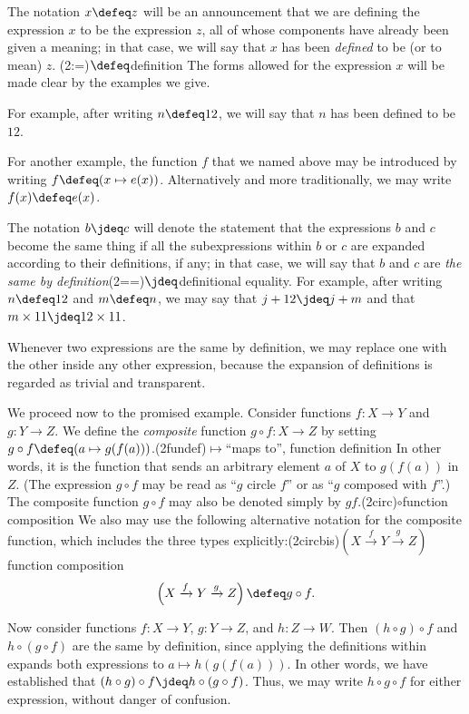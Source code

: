 The notation $x \defeq z$ will be an announcement that we are defining
the expression $x$ to be the expression $z$, all of whose components have already been given a meaning;
in that case, we will say that $x$ has been \emph{defined} to be (or to mean) $z$.%
\glossary(2:=){$\protect\defeq$}{definition}
The forms allowed for the expression $x$ will be made clear by the examples we give.

For example, after writing $n \defeq 12$, we will say that $n$ has been defined to be $12$.

For another example, the function $f$ that we named above may be introduced by writing $f \defeq ( x \mapsto e(x) )$.
Alternatively and more traditionally, we may write $f(x) \defeq e(x)$.

The notation $b \jdeq c$ will denote the statement that the expressions $b$ and $c$ become the same thing if all the subexpressions within $b$
or $c$ are expanded according to their definitions, if any; in that case, we will say that $b$ and $c$ are \emph{the same by
definition}\glossary(2==){$\jdeq$}{definitional equality}.  For example, after writing $n \defeq 12$ and $m \defeq n$, we may say that $j + 12
\jdeq j + m$ and that $m \times 11 \jdeq 12 \times 11$.

Whenever two expressions are the same by definition, we may replace one with the other inside any other expression, because the expansion of
definitions is regarded as trivial and transparent.

We proceed now to the promised example.  Consider functions $f : X \to Y$ and $g : Y \to Z$.  We define the \emph{composite} function $g \circ f
: X \to Z$ by setting $g \circ f \defeq (a \mapsto g(f(a)))$.\glossary(2fundef){$\mapsto$}{``maps to'', function definition} In other words, it
is the function that sends an arbitrary element $a$ of $X$ to $g(f(a))$ in $Z$.  (The expression $g \circ f$ may be read as ``$g$ circle $f$''
or as ``$g$ composed with $f$''.)  The composite function $g \circ f$ may also be denoted simply by $gf$.\glossary(2circ){$\circ$}{function composition}
We also may use the following alternative notation for the composite function, which includes the three
types explicitly:\glossary(2circbis){$ ( X \xrightarrow f Y \xrightarrow g Z ) $}{function composition}
\[
  \left( X \xrightarrow f Y \xrightarrow g Z \right) \defeq g \circ f.
\]

Now consider functions $f : X \to Y$, $g : Y \to Z$, and $h : Z \to W$.  Then $(h \circ g) \circ f$ and $h \circ (g \circ f)$ are the same by
definition, since applying the definitions within expands both expressions to $a \mapsto h(g(f(a)))$.  In other
words, we have established that $(h \circ g) \circ f \jdeq h \circ (g \circ f)$.  Thus, we may write $h \circ g \circ f$ for
either expression, without danger of confusion.

